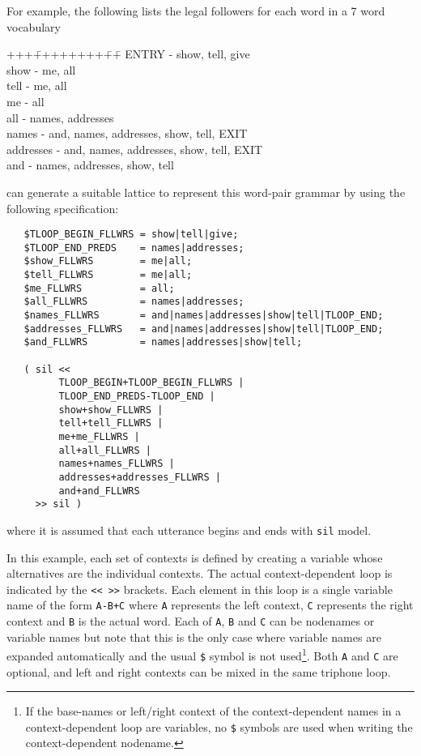 For example, the following lists the legal followers for each
word in a 7 word vocabulary

\begin{tabbing}
+++\=++++++++\=++\= \kill
\> ENTRY \> - \> show, tell, give \\
\> show \> - \> me, all \\
\> tell \> - \> me, all \\
\> me \> - \> all \\
\> all \> - \> names, addresses \\
\> names \> - \> and, names, addresses, show, tell, EXIT \\
\> addresses \> - \> and, names, addresses, show, tell, EXIT \\
\> and \> - \>  names, addresses, show, tell
\end{tabbing}

 can generate a suitable lattice to represent this word-pair
grammar by using the following specification:
\begin{verbatim}
   $TLOOP_BEGIN_FLLWRS = show|tell|give;
   $TLOOP_END_PREDS    = names|addresses;
   $show_FLLWRS        = me|all;
   $tell_FLLWRS        = me|all;
   $me_FLLWRS          = all;
   $all_FLLWRS         = names|addresses;
   $names_FLLWRS       = and|names|addresses|show|tell|TLOOP_END;
   $addresses_FLLWRS   = and|names|addresses|show|tell|TLOOP_END;
   $and_FLLWRS         = names|addresses|show|tell;
     
   ( sil << 
         TLOOP_BEGIN+TLOOP_BEGIN_FLLWRS |
         TLOOP_END_PREDS-TLOOP_END |
         show+show_FLLWRS |
         tell+tell_FLLWRS |
         me+me_FLLWRS |
         all+all_FLLWRS |
         names+names_FLLWRS |
         addresses+addresses_FLLWRS |
         and+and_FLLWRS 
     >> sil )     
\end{verbatim}
where it is assumed that each utterance begins and ends with \texttt{sil}
model. 

In this example, each set of contexts is defined by creating a variable
whose alternatives are the individual contexts.  The actual context-dependent
 loop is indicated by the \texttt{<<  >>} brackets.  
Each element in this loop is a single
variable name of the form \texttt{A-B+C} where \texttt{A} represents the left
context, \texttt{C} represents the right context and \texttt{B} is the actual word.
Each of \texttt{A}, \texttt{B} and \texttt{C} can be nodenames or
variable names but note that this is the only case where variable
names are expanded automatically and the usual
\texttt{\$} symbol is not used\footnote{If the base-names or left/right context of the context-dependent names in a context-dependent loop are variables,  
no \texttt{\$} symbols are used when writing the context-dependent
nodename.}.  Both \texttt{A} and \texttt{C} are optional, and left and
right contexts can be mixed in the same triphone loop.

